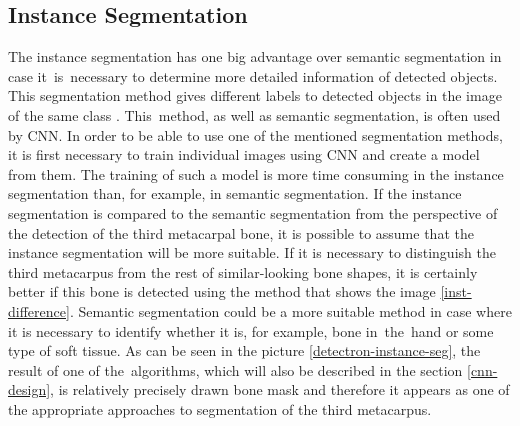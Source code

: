 \subsection{Instance Segmentation}
The instance segmentation has one big advantage over semantic segmentation in case it~is~necessary to determine more detailed information of detected objects. This segmentation method gives different labels to detected objects in the image of the same class  \cite{instance-segmentation}. This~method, as well as semantic segmentation, is often used by CNN. In order to be able to use one of the mentioned segmentation methods, it is first necessary to train individual images using CNN and create a model from them. The training of such a model is more time consuming in the instance segmentation than, for example, in semantic segmentation. If the instance segmentation is compared to the semantic segmentation from the perspective of the detection of the third metacarpal bone, it is possible to assume that the instance segmentation will be more suitable. If it is necessary to distinguish the third metacarpus from the rest of similar-looking bone shapes, it is certainly better if this bone is detected using the method that shows the image \ref{inst-difference}. Semantic segmentation could be a more suitable method in case where it is necessary to identify whether it is, for example, bone in~the~hand or some type of soft tissue. As can be seen in the picture \ref{detectron-instance-seg}, the result of one of the~algorithms, which will also be described in the section \ref{cnn-design}, is relatively precisely drawn bone mask and therefore it appears as one of the appropriate approaches to segmentation of the third metacarpus.

